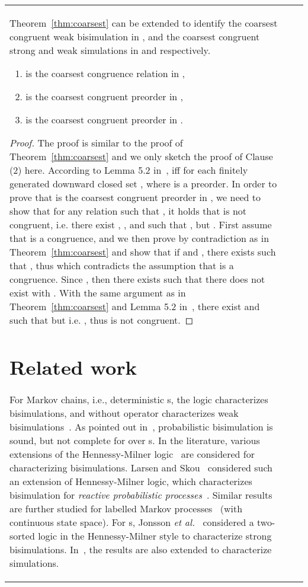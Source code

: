\documentclass{LMCS}
\begin{document}
\begin{table}
\begin{tabular}{|l|c|c|}
Theorem~\ref{thm:coarsest} can be extended to identify the coarsest congruent weak bisimulation in , and the coarsest congruent strong and weak simulations in  and  respectively.
\begin{thm}\label{thm:coarsest 1}\hfill
\begin{enumerate}[\em(1)]
\item  is the coarsest congruence relation in ,
\item  is the coarsest congruent preorder in ,
\item  is the coarsest congruent preorder in .
\end{enumerate}
\end{thm}
\begin{proof}
The proof is similar to the proof of Theorem~\ref{thm:coarsest} and we only sketch the proof of Clause (2) here. According to Lemma 5.2 in~\cite{HermannsPSWZ11},  iff for each finitely generated  downward closed set ,  where  is a preorder. In order to prove that  is the coarsest congruent preorder in , we need to show that for any relation  such that , it holds that  is not congruent, i.e. there exist , , and  such that , but . First assume that  is a congruence, and we then prove by contradiction as in Theorem~\ref{thm:coarsest} and show that if  and , there exists  such that , thus  which contradicts the assumption that  is a congruence. Since , then there exists  such that there does not exist  with . With the same argument as in Theorem~\ref{thm:coarsest} and Lemma 5.2 in~\cite{HermannsPSWZ11}, there exist  and  such that  but  i.e. , thus  is not congruent.
\end{proof}



\section{Related work}\label{sec:related}
For Markov chains, i.e., deterministic s, the
logic  characterizes bisimulations, and  without  operator
characterizes weak bisimulations~\cite{HanssonJ90,BaierKHW05}.  As pointed out
in~\cite{SegalaL95}, probabilistic bisimulation  is sound, but not complete for  over s.
In the literature, various extensions of the Hennessy-Milner logic~\cite{HennessyM85} are considered for characterizing
bisimulations. Larsen and Skou~\cite{larsen1991bisimulation} considered such an
extension of Hennessy-Milner logic, which characterizes bisimulation for
\emph{reactive probabilistic processes}~\cite{larsen1991bisimulation}. Similar results are further studied for labelled Markov
processes~\cite{prakash-book,DesharnaisGJP10} (with continuous state space).  For s, Jonsson
\emph{et al.}~\cite{Jonsson} considered a two-sorted logic in the
Hennessy-Milner style to characterize strong bisimulations. In~\cite{HermannsPSWZ11}, the results are 
also extended to characterize simulations.




\end{tabular}
\end{table}
\end{document}
